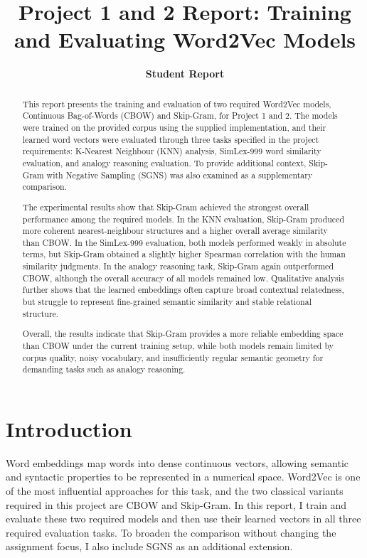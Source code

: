 \documentclass[11pt,a4paper]{article}
\title{Project 1 and 2 Report: Training and Evaluating Word2Vec Models}
\author{\textbf{Student Report}}
\date{}
\begin{document}
\maketitle

\begin{abstract}
This report presents the training and evaluation of two required Word2Vec models, Continuous Bag-of-Words (CBOW) and Skip-Gram, for Project 1 and 2. The models were trained on the provided corpus using the supplied implementation, and their learned word vectors were evaluated through three tasks specified in the project requirements: K-Nearest Neighbour (KNN) analysis, SimLex-999 word similarity evaluation, and analogy reasoning evaluation. To provide additional context, Skip-Gram with Negative Sampling (SGNS) was also examined as a supplementary comparison.

The experimental results show that Skip-Gram achieved the strongest overall performance among the required models. In the KNN evaluation, Skip-Gram produced more coherent nearest-neighbour structures and a higher overall average similarity than CBOW. In the SimLex-999 evaluation, both models performed weakly in absolute terms, but Skip-Gram obtained a slightly higher Spearman correlation with the human similarity judgments. In the analogy reasoning task, Skip-Gram again outperformed CBOW, although the overall accuracy of all models remained low. Qualitative analysis further shows that the learned embeddings often capture broad contextual relatedness, but struggle to represent fine-grained semantic similarity and stable relational structure.

Overall, the results indicate that Skip-Gram provides a more reliable embedding space than CBOW under the current training setup, while both models remain limited by corpus quality, noisy vocabulary, and insufficiently regular semantic geometry for demanding tasks such as analogy reasoning.
\end{abstract}

\section{Introduction}
Word embeddings map words into dense continuous vectors, allowing semantic and syntactic properties to be represented in a numerical space. Word2Vec is one of the most influential approaches for this task, and the two classical variants required in this project are CBOW and Skip-Gram. In this report, I train and evaluate these two required models and then use their learned vectors in all three required evaluation tasks. To broaden the comparison without changing the assignment focus, I also include SGNS as an additional extension.
\end{document}
